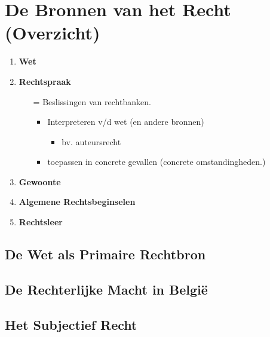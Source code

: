 \section{De Bronnen van het Recht (Overzicht)}
\begin{enumerate}
	\item \textbf{Wet}
	
	\item \textbf{Rechtspraak}
	\begin{itemize}
		\item[=] Beslissingen van rechtbanken.
		\begin{itemize}
			\item Interpreteren v/d wet (en andere bronnen)
			\begin{itemize}
				\item bv. auteursrecht
			\end{itemize}
		\item toepassen in concrete gevallen (concrete omstandingheden.)
		\end{itemize}
	\end{itemize}
	\item \textbf{Gewoonte}
	
	\item \textbf{Algemene Rechtsbeginselen}
	\item \textbf{Rechtsleer}
\end{enumerate}
\subsection*{De Wet als Primaire Rechtbron}

\subsection*{De Rechterlijke Macht in Belgi\"e}

\subsection*{Het Subjectief Recht}
